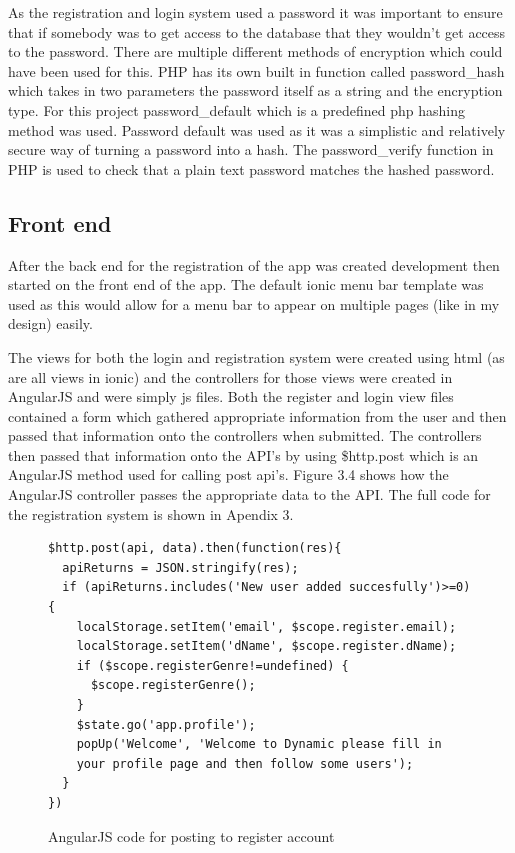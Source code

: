 As the registration and login system used a password it was important to ensure that if somebody was to get access to the database that they wouldn't get access to the password. There are multiple different methods of encryption which could have been used for this. PHP has its own built in function called password\_hash which takes in two parameters the password itself as a string and the encryption type. For this project password\_default which is a predefined php hashing method was used. Password default was used as it was a simplistic and relatively secure way of turning a password into a hash. The password\_verify function in PHP is used to check that a plain text password matches the hashed password.
 
\subsection{Front end}
After the back end for the registration of the app was created development then started on the front end of the app. The default ionic menu bar template was used as this would allow for a menu bar to appear on multiple pages (like in my design) easily.

The views for both the login and registration system were created using html (as are all views in ionic) and the controllers for those views were created in AngularJS and were simply js files. Both the register and login view files contained a form which gathered appropriate information from the user and then passed that information onto the controllers when submitted. The controllers then passed that information onto the API's by using \$http.post which is an AngularJS method used for calling post api's. Figure 3.4 shows how the AngularJS controller passes the appropriate data to the API. The full code for the registration system is shown in Apendix 3.
\begin{center}
\begin{figure}[H]
\begin{verbatim}
$http.post(api, data).then(function(res){
  apiReturns = JSON.stringify(res);
  if (apiReturns.includes('New user added succesfully')>=0) {
    localStorage.setItem('email', $scope.register.email);
    localStorage.setItem('dName', $scope.register.dName);
    if ($scope.registerGenre!=undefined) {
      $scope.registerGenre();
    }
    $state.go('app.profile');
    popUp('Welcome', 'Welcome to Dynamic please fill in 
    your profile page and then follow some users');
  }
})
\end{verbatim}
\caption{AngularJS code for posting to register account}
\end{figure}
\end{center}

